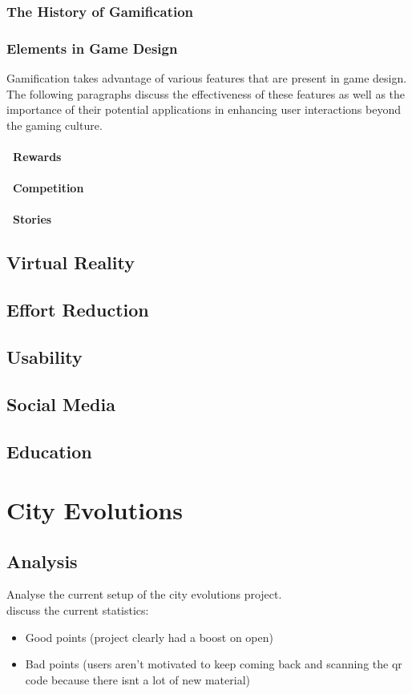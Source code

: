 \documentclass[a4paper,12pt]{article}
\begin{document}
\subsubsection{The History of Gamification}
\subsubsection{Elements in Game Design}
Gamification takes advantage of various features that are present in game design. The following paragraphs discuss the effectiveness of these features as well as the importance of their potential applications in enhancing user interactions beyond the gaming culture. 
\paragraph{\indent~Rewards}
\paragraph{\indent~Competition}
\paragraph{\indent~Stories}

\subsection{Virtual Reality}
\subsection{Effort Reduction}
\subsection{Usability}
\subsection{Social Media}\label{sec:social-media}
\subsection{Education}
\newpage
\section{City Evolutions}
\subsection{Analysis}
Analyse the current setup of the city evolutions project.\\
discuss the current statistics:
\begin{itemize}
	\item{Good points (project clearly had a boost on open)}
	\item{Bad points (users aren't motivated to keep coming back and scanning the qr code because there isnt a lot of new material)}
\end{itemize}
\end{document}
